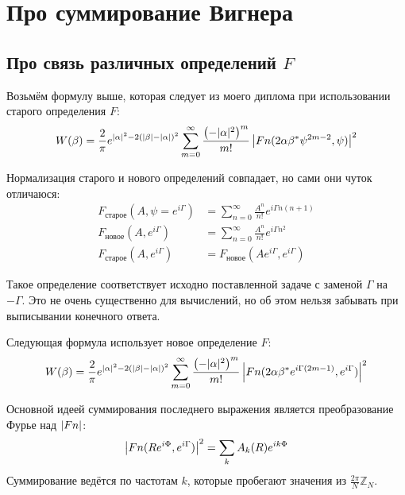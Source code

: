 \documentclass[a4paper, 12pt]{article}
\newenvironment{eqw}{\begin{equation} \begin{aligned}}   
    {\end{aligned}    \end{equation}}
\begin{document}
\section{Про суммирование Вигнера}
\subsection*{Про связь различных определений $F$}
Возьмём формулу выше, которая следует из моего диплома при использовании старого определения $F$:
\begin{equation}\label{QtoW}
	\begin{aligned}
		W(\beta) = \frac{2}{\pi}e^{\abs{\alpha}^2-2\left(\abs{\beta} - \abs{\alpha}\right)^2}\sum\limits_{m=0}^{\infty} \frac{\left(-|\alpha|^2\right)^m}{m!}\left|Fn(2\alpha \beta^*\psi^{2m-2}, \psi)\right|^2
	\end{aligned}
\end{equation}

Нормализация старого и нового определений совпадает, но сами они чуток отличаюся:
\begin{eqw}
     F_{\text{старое}}(A, \psi = e^{i\Gamma}) &= \sum\limits_{n=0}^{\infty} \frac{A^n}{n!}e^{i\Gamma n(n+1)}\\
     F_{\text{новое}}(A, e^{i\Gamma}) &= \sum\limits_{n=0}^{\infty} \frac{A^n}{n!}e^{i\Gamma n^2}\\
     F_{\text{старое}}(A, e^{i\Gamma}) &= F_{\text{новое}}(Ae^{i\Gamma}, e^{i\Gamma})
\end{eqw}

Такое определение соответствует исходно поставленной задаче с заменой $\Gamma$ на $-\Gamma$. Это не очень существенно для вычислений, но об этом нельзя забывать при выписывании конечного ответа.

Следующая формула использует новое определение $F$:
\begin{eqw}
    W(\beta) = \frac{2}{\pi}e^{\abs{\alpha}^2-2\left(\abs{\beta} - \abs{\alpha}\right)^2}\sum\limits_{m=0}^{\infty} \frac{\left(-|\alpha|^2\right)^m}{m!}\left|Fn(2\alpha \beta^*e^{i\Gamma(2m-1)}, e^{i\Gamma})\right|^2
\end{eqw}

Основной идеей суммирования последнего выражения является преобразование Фурье над $\abs{Fn}$:
\begin{eqw}
    \abs{Fn(Re^{i\Phi}, e^{i\Gamma})}^2 = \sum\limits_k A_k(R)e^{ik\Phi}
\end{eqw}
Суммирование ведётся по частотам $k$, которые пробегают значения из $\frac{2\pi}{N}\mathbb{Z}_N$.
\end{document}
